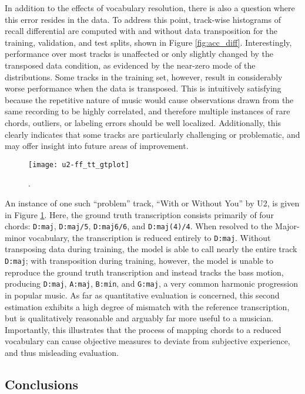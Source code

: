 In addition to the effects of vocabulary resolution, there is also a question where this error resides in the data.
To address this point, track-wise histograms of recall differential are computed with and without data transposition for the training, validation, and test splits, shown in Figure \ref{fig:acc_diff}.
Interestingly, performance over most tracks is unaffected or only slightly changed by the transposed data condition, as evidenced by the near-zero mode of the distributions.
Some tracks in the training set, however, result in considerably worse performance when the data is transposed.
This is intuitively satisfying because the repetitive nature of music would cause observations drawn from the same recording to be highly correlated, and therefore multiple instances of rare chords, outliers, or labeling errors should be well localized.
Additionally, this clearly indicates that some tracks are particularly challenging or problematic, and may offer insight into future areas of improvement.

\begin{figure}[!t]
\centering
\texttt{[image: u2-ff\_tt\_gtplot]}
\caption{.}
\label{fig:u2fu}
\end{figure}

An instance of one such ``problem'' track, ``With or Without You'' by U2, is given in Figure \ref{fig:u2fu}.
Here, the ground truth transcription consists primarily of four chords: \texttt{D:maj}, \texttt{D:maj/5}, \texttt{D:maj6/6}, and \texttt{D:maj(4)/4}.
When resolved to the Major-minor vocabulary, the transcription is reduced entirely to \texttt{D:maj}.
Without transposing data during training, the model is able to call nearly the entire track \texttt{D:maj}; with transposition during training, however, the model is unable to reproduce the ground truth transcription and instead tracks the bass motion, producing \texttt{D:maj}, \texttt{A:maj}, \texttt{B:min}, and \texttt{G:maj}, a very common harmonic progression in popular music.
As far as quantitative evaluation is concerned, this second estimation exhibits a high degree of mismatch with the reference transcription, but is qualitatively reasonable and arguably far more useful to a musician.
Importantly, this illustrates that the process of mapping chords to a reduced vocabulary can cause objective measures to deviate from subjective experience, and thus misleading evaluation.


\subsection{Conclusions}
\label{subsec:conclusions}

